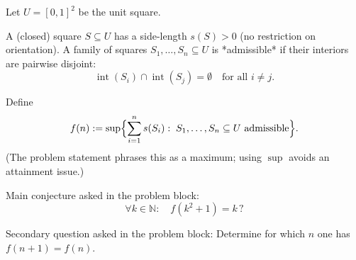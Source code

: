 Let $U=[0,1]^2$ be the unit square.

A (closed) square $S\subseteq U$ has a side-length $s(S)>0$ (no restriction on
orientation). A family of squares $S_1,\dots,S_n\subseteq U$ is *admissible* if
their interiors are pairwise disjoint:
\[\operatorname{int}(S_i)\cap\operatorname{int}(S_j)=\emptyset\quad\text{for all }i\neq j.\]

Define
\[f(n):=\sup\Bigl\{\sum_{i=1}^n s(S_i):\; S_1,\dots,S_n\subseteq U\text{ admissible}\Bigr\}.
\]
(The problem statement phrases this as a maximum; using $\sup$ avoids an
attainment issue.)

Main conjecture asked in the problem block:
\[\forall k\in\mathbb N:\quad f(k^2+1)=k\,?\]

Secondary question asked in the problem block:
Determine for which $n$ one has $f(n+1)=f(n)$.
